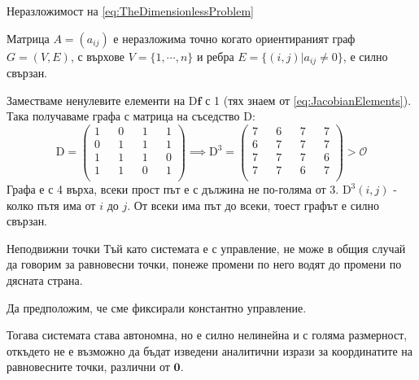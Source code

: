  \begin{frame}[t]{Неразложимост на \ref{eq:TheDimensionlessProblem}}
  \begin{theorem}
  \label{theorem:ConnectedIrreducability}
  Матрица $A=(a_{ij})$ е неразложима точно когато ориентираният граф $G=(V,E)$, с върхове $V=\{1, \cdots, n\}$ и ребра $E=\{(i,j) \vert a_{ij} \neq 0 \}$, е силно свързан.
  \end{theorem}

  Заместваме ненулевите елементи на $\mathrm{D} \boldsymbol{f}$ с 1 (тях знаем от \ref{eq:JacobianElements}). Така получаваме графа с матрица на съседство $\mathrm{D}$:
  \begin{equation}
    \mathrm{D} =
    \begin{pmatrix}
      1 && 0 && 1 && 1 \\
      0 && 1 && 1 && 1 \\
      1 && 1 && 1 && 0 \\
      1 && 1 && 0 && 1 \\
    \end{pmatrix}
    \implies
    \mathrm{D}^3 =
    \begin{pmatrix}
      7 && 6 && 7 && 7 \\
      6 && 7 && 7 && 7 \\
      7 && 7 && 7 && 6 \\
      7 && 7 && 6 && 7 \\
    \end{pmatrix}
    >
    \mathscr{O}
  \end{equation}
  Графа е с 4 върха, всеки прост път е с дължина не по-голяма от 3.
  $\mathrm{D}^3(i,j)$ - колко пътя има от $i$ до $j$.
  От всеки има път до всеки, тоест графът е силно свързан.
  \end{frame}

\begin{frame}[t]{Неподвижни точки}
Тъй като системата е с управление, не може в общия случай да говорим за равновесни точки, понеже промени по него водят до промени по дясната страна.

Да предположим, че сме фиксирали константно управление.

Тогава системата става автономна, но е силно нелинейна и с голяма размерност, откъдето не е възможно да бъдат изведени аналитични изрази за координатите на равновесните точки, различни от $\boldsymbol{0}$.
\end{frame}

